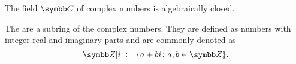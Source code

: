 \begin{theorem}\label{thm:fundamental_theorem_of_algebra}
  The field \( \C \) of complex numbers is algebraically closed.
\end{theorem}

\begin{definition}\label{def:gaussian_integers}
  The  are a subring of the complex numbers. They are defined as numbers with integer real and imaginary parts and are commonly denoted as
  \begin{equation*}
    \Z[i] \coloneqq \{ a + bi \colon a, b \in \Z \}.
  \end{equation*}
\end{definition}
